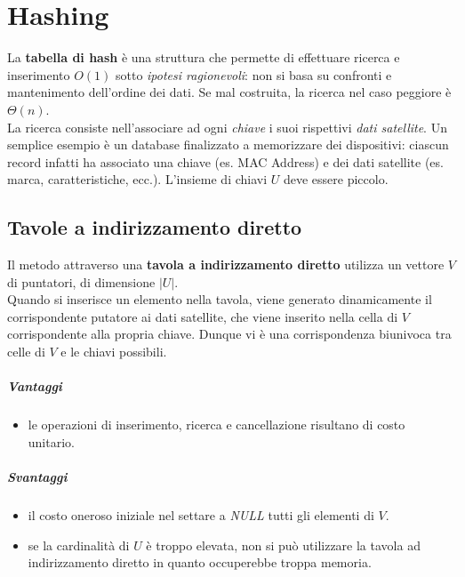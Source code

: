 \chapter{Hashing}
La \textbf{tabella di hash} è una struttura che permette di effettuare ricerca e inserimento $O(1)$ sotto \textit{ipotesi ragionevoli}: non si basa su confronti e mantenimento dell'ordine dei dati. Se mal costruita, la ricerca nel caso peggiore è $\varTheta(n)$.\\
La ricerca consiste nell'associare ad ogni \textit{chiave} i suoi rispettivi \textit{dati satellite}. Un semplice esempio è un database finalizzato a memorizzare dei dispositivi: ciascun record infatti ha associato una chiave (es. MAC Address) e dei dati satellite (es. marca, caratteristiche, ecc.). L'insieme di chiavi $U$ deve essere piccolo.

\section{Tavole a indirizzamento diretto}
Il metodo attraverso una \textbf{tavola a indirizzamento diretto} utilizza un vettore $V$ di puntatori, di dimensione $|U|$.\\
Quando si inserisce un elemento nella tavola, viene generato dinamicamente il corrispondente putatore ai dati satellite, che viene inserito nella cella di $V$ corrispondente alla propria chiave. Dunque vi è una corrispondenza biunivoca tra celle di $V$ e le chiavi possibili.

\paragraph{Vantaggi}
\begin{itemize}
	\item le operazioni di inserimento, ricerca e cancellazione risultano di costo unitario.
\end{itemize}
\paragraph{Svantaggi}
\begin{itemize}
	\item il costo oneroso iniziale nel settare a \textit{NULL} tutti gli elementi di $V$.
	\item se la cardinalità di $U$ è troppo elevata, non si può utilizzare la tavola ad indirizzamento diretto in quanto occuperebbe troppa memoria.
\end{itemize}

